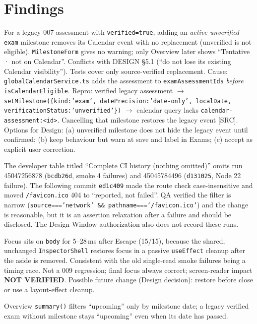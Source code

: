 \documentclass[11pt,a4paper]{article}
\newcommand{\sha}[1]{\texttt{\small #1}}
\newcommand{\NV}{\textcolor{gray!60!black}{\textbf{NOT VERIFIED}}}
\begin{document}
\section{Findings}
\begin{description}[style=nextline,leftmargin=0.9cm,nosep]
  \item[F-01 --- Medium, Design ruling required] For a legacy 007 assessment with \texttt{verified=true}, adding an \emph{active unverified} \texttt{exam} milestone removes its Calendar event with no replacement (unverified is not eligible). \texttt{MilestoneForm} gives no warning; only Overview later shows ``Tentative · not on Calendar''. Conflicts with DESIGN \S5.1 (``do not lose its existing Calendar visibility''). Tests cover only source-verified replacement. Cause: \texttt{globalCalendarService.ts} adds the assessment to \texttt{examAssessmentIds} \emph{before} \texttt{isCalendarEligible}. Repro: verified legacy assessment $\to$ \texttt{setMilestone(\{kind:'exam', datePrecision:'date-only', localDate, verificationStatus:'unverified'\})} $\to$ calendar query lacks \texttt{calendar-assessment:<id>}. Cancelling that milestone restores the legacy event [SRC]. Options for Design: (a) unverified milestone does not hide the legacy event until confirmed; (b) keep behaviour but warn at save and label in Exams; (c) accept as explicit user correction.
  \item[F-02 --- Medium, disclosure] The developer table titled ``Complete CI history (nothing omitted)'' omits run 45047256878 (\sha{bcdb26d}, smoke 4 failures) and 45045784496 (\sha{d131025}, Node 22 failure). The following commit \sha{ed1c409} made the route check case-insensitive and moved \texttt{/favicon.ico} 404 to ``reported, not failed''. QA verified the filter is narrow (\texttt{source==='network' \&\& pathname==='/favicon.ico'}) and the change is reasonable, but it is an assertion relaxation after a failure and should be disclosed. The Design Window authorization also does not record these runs.
  \item[F-03 --- Low, accessibility, pre-existing] Focus sits on \texttt{body} for 5--28\,ms after Escape (15/15), because the shared, unchanged \texttt{InspectorShell} restores focus in a passive \texttt{useEffect} cleanup after the aside is removed. Consistent with the old single-read smoke failures being a timing race. Not a 009 regression; final focus always correct; screen-reader impact \NV. Possible future change (Design decision): restore before close or use a layout-effect cleanup.
  \item[F-04 --- Low] Overview \texttt{summary()} filters ``upcoming'' only by milestone date; a legacy verified exam without milestone stays ``upcoming'' even when its date has passed.

\end{description}
\end{document}

